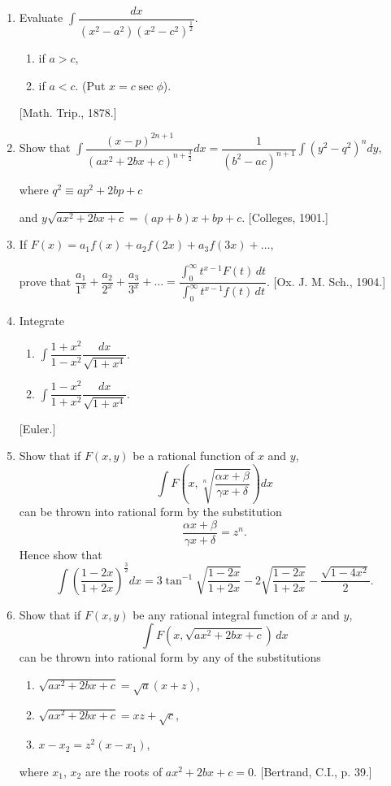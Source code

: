 \documentclass[11pt, a4paper]{article}
\newcommand{\source}[1]{\hfill\textnormal{[#1]}}
\begin{document}
\begin{enumerate}[leftmargin=2em]
Hence obtain $\displaystyle\int \dfrac{dx}{(a+x)^2(c+x)^{\frac12}}$.

Deduce also $\displaystyle\int \dfrac{dx}{(a+x)(c+x)^{\frac32}}$.

\item Evaluate $\displaystyle\int \dfrac{dx}{(x^2-a^2)(x^2-c^2)^{\frac12}}$.
\begin{enumerate}[label=(\roman*)]
\item if $a>c$,
\item if $a<c$. (Put $x=c\sec\phi$).
\end{enumerate}
\source{Math. Trip., 1878.}

\item Show that $\displaystyle\int \dfrac{(x-p)^{2n+1}}{(ax^2+2bx+c)^{n+\frac32}}dx=\dfrac{1}{(b^2-ac)^{n+1}}\int (y^2-q^2)^n dy$,

where $q^2\equiv ap^2+2bp+c$

and $y\sqrt{ax^2+2bx+c}=(ap+b)x+bp+c$. \source{Colleges, 1901.}

\item If $F(x)=a_1f(x)+a_2f(2x)+a_3f(3x)+\dots$,

prove that $\dfrac{a_1}{1^x}+\dfrac{a_2}{2^x}+\dfrac{a_3}{3^x}+\dots=\dfrac{\int_0^\infty t^{x-1}F(t)\,dt}{\int_0^\infty t^{x-1}f(t)\,dt}$. \source{Ox. J. M. Sch., 1904.}

\item Integrate
\begin{enumerate}[label=(\roman*)]
\item $\displaystyle\int \dfrac{1+x^2}{1-x^2}\dfrac{dx}{\sqrt{1+x^4}}$.
\item $\displaystyle\int \dfrac{1-x^2}{1+x^2}\dfrac{dx}{\sqrt{1+x^4}}$.
\end{enumerate}
\source{Euler.}

\item Show that if $F(x,y)$ be a rational function of $x$ and $y$,
\[
\int F\left(x,\sqrt[n]{\dfrac{\alpha x+\beta}{\gamma x+\delta}}\right)dx
\]
can be thrown into rational form by the substitution
\[
\dfrac{\alpha x+\beta}{\gamma x+\delta}=z^n.
\]
Hence show that
\[
\int \left(\dfrac{1-2x}{1+2x}\right)^{\frac32}dx=3\tan^{-1}\sqrt{\dfrac{1-2x}{1+2x}}-2\sqrt{\dfrac{1-2x}{1+2x}}-\dfrac{\sqrt{1-4x^2}}{2}.
\]

\item Show that if $F(x,y)$ be any rational integral function of $x$ and $y$,
\[
\int F(x,\sqrt{ax^2+2bx+c})\,dx
\]
can be thrown into rational form by any of the substitutions
\begin{enumerate}[label=(\arabic*)]
\item $\sqrt{ax^2+2bx+c}=\sqrt a(x+z)$,
\item $\sqrt{ax^2+2bx+c}=xz+\sqrt c$,
\item $x-x_2=z^2(x-x_1)$,
\end{enumerate}
where $x_1$, $x_2$ are the roots of $ax^2+2bx+c=0$. \source{Bertrand, C.I., p. 39.}


\end{enumerate}
\end{document}
